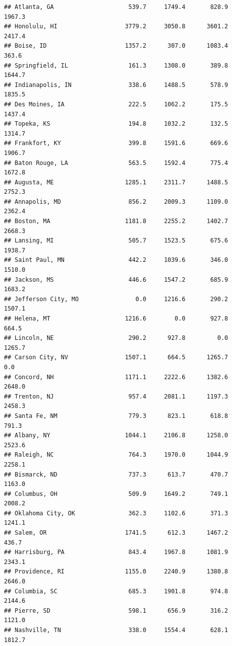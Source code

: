 \documentclass[
]{article}
\begin{document}
\begin{verbatim}
## Atlanta, GA                     539.7     1749.4       828.9          1967.3
## Honolulu, HI                   3779.2     3050.8      3601.2          2417.4
## Boise, ID                      1357.2      307.0      1083.4           363.6
## Springfield, IL                 161.3     1308.0       389.8          1644.7
## Indianapolis, IN                338.6     1488.5       578.9          1835.5
## Des Moines, IA                  222.5     1062.2       175.5          1437.4
## Topeka, KS                      194.8     1032.2       132.5          1314.7
## Frankfort, KY                   399.8     1591.6       669.6          1906.7
## Baton Rouge, LA                 563.5     1592.4       775.4          1672.8
## Augusta, ME                    1285.1     2311.7      1488.5          2752.3
## Annapolis, MD                   856.2     2009.3      1109.0          2362.4
## Boston, MA                     1181.8     2255.2      1402.7          2668.3
## Lansing, MI                     505.7     1523.5       675.6          1938.7
## Saint Paul, MN                  442.2     1039.6       346.0          1510.0
## Jackson, MS                     446.6     1547.2       685.9          1683.2
## Jefferson City, MO                0.0     1216.6       290.2          1507.1
## Helena, MT                     1216.6        0.0       927.8           664.5
## Lincoln, NE                     290.2      927.8         0.0          1265.7
## Carson City, NV                1507.1      664.5      1265.7             0.0
## Concord, NH                    1171.1     2222.6      1382.6          2648.0
## Trenton, NJ                     957.4     2081.1      1197.3          2458.3
## Santa Fe, NM                    779.3      823.1       618.8           791.3
## Albany, NY                     1044.1     2106.8      1258.0          2523.6
## Raleigh, NC                     764.3     1970.0      1044.9          2258.1
## Bismarck, ND                    737.3      613.7       470.7          1163.0
## Columbus, OH                    509.9     1649.2       749.1          2008.2
## Oklahoma City, OK               362.3     1102.6       371.3          1241.1
## Salem, OR                      1741.5      612.3      1467.2           436.7
## Harrisburg, PA                  843.4     1967.8      1081.9          2343.1
## Providence, RI                 1155.0     2240.9      1380.8          2646.0
## Columbia, SC                    685.3     1901.8       974.8          2144.6
## Pierre, SD                      598.1      656.9       316.2          1121.0
## Nashville, TN                   338.0     1554.4       628.1          1812.7

\end{verbatim}
\end{document}
